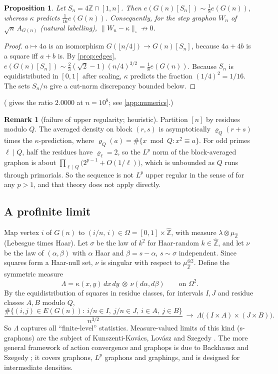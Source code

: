 \documentclass[11pt]{amsart}
\newtheorem{proposition}[theorem]{Proposition}
\theoremstyle{definition}
\newtheorem{remark}[theorem]{Remark}
\newcommand{\Zhat}{\widehat{\mathbb{Z}}}
\begin{document}
\begin{proposition}\label{prop:mod4}
Let $S_n=4\mathbb{Z}\cap[1,n]$. Then $e(G(n)[S_n])\sim\frac18 e(G(n))$, whereas
$\kappa$ predicts $\frac1{16}e(G(n))$. Consequently, for the step graphon $W_n$ of
$\sqrt n\,A_{G(n)}$ (natural labelling), $\|W_n-\kappa\|_\square\not\to0$.
\end{proposition}
\begin{proof}
$a\mapsto 4a$ is an isomorphism $G(\lfloor n/4\rfloor)\to G(n)[S_n]$, because
$4a+4b$ is a square iff $a+b$ is. By \cref{prop:edges},
$e(G(n)[S_n])\sim\frac23(\sqrt2-1)(n/4)^{3/2}=\frac18e(G(n))$. Because $S_n$ is
equidistributed in $[0,1]$ after scaling, $\kappa$ predicts the fraction
$(1/4)^2=1/16$. The sets $S_n/n$ give a cut-norm discrepancy bounded below.
\end{proof}
( gives the ratio $2.0000$ at $n=10^8$; see \cref{app:numerics}.)

\begin{remark}[failure of upper regularity; heuristic]
Partition $[n]$ by residues modulo $Q$. The averaged density on block $(r,s)$ is
asymptotically $\varrho_Q(r+s)$ times the $\kappa$-prediction, where
$\varrho_Q(a)=\#\{x\bmod Q:x^2\equiv a\}$. For odd primes $\ell\mid Q$, half the
residues have $\varrho_\ell=2$, so the $L^p$ norm of the block-averaged graphon is about
$\prod_{\ell\mid Q}\bigl(2^{p-1}+O(1/\ell)\bigr)$, which is unbounded as $Q$ runs
through primorials. So the sequence is not $L^p$ upper regular in the sense of
\cite{BCCZ1} for any $p>1$, and that theory does not apply directly.
\end{remark}

\subsection{A profinite limit}
Map vertex $i$ of $G(n)$ to $(i/n,\,i)\in\Omega=[0,1]\times\Zhat$, with measure
$\lambda\otimes\mu_{\Zhat}$ (Lebesgue times Haar). Let $\sigma$ be the law of $k^2$
for Haar-random $k\in\Zhat$, and let $\nu$ be the law of $(\alpha,\beta)$ with $\alpha$
Haar and $\beta=s-\alpha$, $s\sim\sigma$ independent. Since squares form a Haar-null
set, $\nu$ is singular with respect to $\mu_{\Zhat}^{\otimes2}$. Define the symmetric
measure
\[
\Lambda=\kappa(x,y)\,dx\,dy\ \otimes\ \nu(d\alpha,d\beta)\qquad\text{on }\Omega^2 .
\]
By the equidistribution of squares in residue classes, for intervals $I,J$ and residue
classes $A,B$ modulo $Q$,
\[
\frac{\#\{(i,j)\in E(G(n)):\ i/n\in I,\ j/n\in J,\ i\in A,\ j\in B\}}{n^{3/2}}
\ \longrightarrow\ \Lambda\bigl((I\times A)\times(J\times B)\bigr).
\]
So $\Lambda$ captures all ``finite-level'' statistics. Measure-valued limits of
this kind (s-graphons) are the subject of Kunszenti-Kov\'acs, Lov\'asz and Szegedy
\cite{KLS}. The more general framework of action convergence and graphops is due to
Backhausz and Szegedy \cite{BackhauszSzegedy}; it covers graphons, $L^p$ graphons and
graphings, and is designed for intermediate densities.
\end{document}
